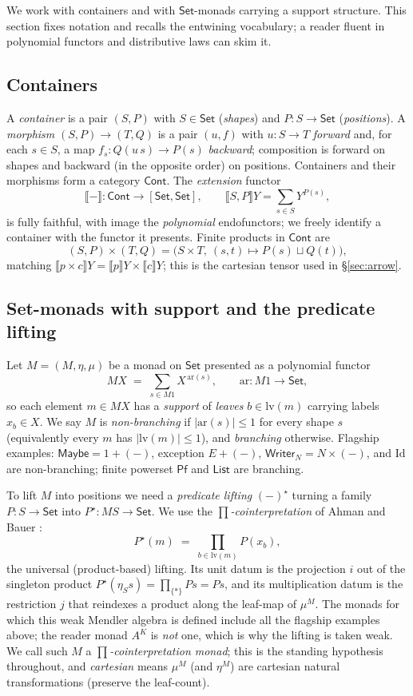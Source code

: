 \documentclass[11pt]{amsart}
\theoremstyle{plain}
\theoremstyle{definition}
\theoremstyle{remark}
\newcommand{\Set}{\mathsf{Set}}
\newcommand{\Cont}{\mathsf{Cont}}
\newcommand{\lv}{\mathrm{lv}}
\newcommand{\Ext}[1]{\llbracket #1\rrbracket}
\newcommand{\cont}[2]{(#1,#2)}
\newcommand{\Maybe}{\mathsf{Maybe}}
\newcommand{\Pf}{\mathsf{Pf}}
\newcommand{\Writer}{\mathsf{Writer}}
\newcommand{\List}{\mathsf{List}}
\begin{document}
We work with containers and with $\Set$-monads carrying a support structure. This section
fixes notation and recalls the entwining vocabulary; a reader fluent in polynomial functors
and distributive laws can skim it.

\subsection{Containers}
A \emph{container} is a pair $\cont S P$ with $S\in\Set$ (\emph{shapes}) and $P\colon S\to
\Set$ (\emph{positions}). A \emph{morphism} $\cont S P \to \cont T Q$ is a pair $(u,f)$ with
$u\colon S\to T$ \emph{forward} and, for each $s\in S$, a map $f_s\colon Q(u\,s)\to P(s)$
\emph{backward}; composition is forward on shapes and backward (in the opposite order) on
positions. Containers and their morphisms form a category $\Cont$. The \emph{extension}
functor
\[
  \Ext{-}\colon \Cont \longrightarrow [\Set,\Set],\qquad
  \Ext{S,P}Y = \sum_{s\in S} Y^{P(s)},
\]
is fully faithful, with image the \emph{polynomial} endofunctors; we freely identify a
container with the functor it presents. Finite products in $\Cont$ are
\[
  \cont S P \times \cont T Q = \bigl(S\times T,\ (s,t)\mapsto P(s)\sqcup Q(t)\bigr),
\]
matching $\Ext{p\times c}Y = \Ext p Y\times\Ext c Y$; this is the cartesian tensor used in
\S\ref{sec:arrow}.

\subsection{Set-monads with support and the predicate lifting}\label{sec:prelim-lifting}
Let $M=(M,\eta,\mu)$ be a monad on $\Set$ presented as a polynomial functor
\[
  M X \;=\; \sum_{s\in M1} X^{\,\mathrm{ar}(s)},\qquad \mathrm{ar}\colon M1\to\Set,
\]
so each element $m\in MX$ has a \emph{support} of \emph{leaves} $b\in\lv(m)$ carrying labels
$x_b\in X$. We say $M$ is \emph{non-branching} if $|\mathrm{ar}(s)|\le 1$ for every shape
$s$ (equivalently every $m$ has $|\lv(m)|\le 1$), and \emph{branching} otherwise. Flagship
examples: $\Maybe = 1+(-)$, exception $E+(-)$, $\Writer_N = N\times(-)$, and $\mathrm{Id}$
are non-branching; finite powerset $\Pf$ and $\List$ are branching.

To lift $M$ into positions we need a \emph{predicate lifting} $(-)^\star$ turning a family
$P\colon S\to\Set$ into $P^\star\colon MS\to\Set$. We use the \emph{$\prod$-cointerpretation}
of Ahman and Bauer \cite[\S6.1,\S6.5]{AhmanBauer24}:
\[
  P^\star(m) \;=\; \prod_{b\in\lv(m)} P(x_b),
\]
the universal (product-based) lifting. Its unit datum is the projection $i$ out of the
singleton product $P^\star(\eta_S s)=\prod_{\{*\}}P s = Ps$, and its multiplication datum is
the restriction $j$ that reindexes a product along the leaf-map of $\mu^M$. The monads for
which this weak Mendler algebra is defined include all the flagship examples above; the
reader monad $A^K$ is \emph{not} one, which is why the lifting is taken weak. We call such
$M$ a \emph{$\prod$-cointerpretation monad}; this is the standing hypothesis throughout, and
\emph{cartesian} means $\mu^M$ (and $\eta^M$) are cartesian natural transformations
(preserve the leaf-count).
\end{document}
